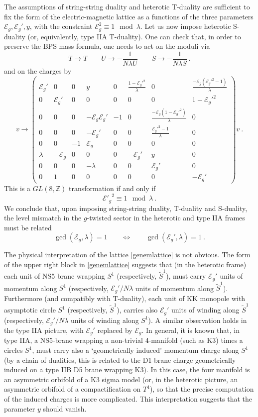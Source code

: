 \documentclass[a4paper,11pt]{article}
\newcommand{\ZZ}{\mathbb{Z}}
\newcommand{\E}{\mathcal{E}}
\numberwithin{equation}{section}
\def\be{\begin{equation}}
\def\ee{\end{equation}}
\begin{document}
The assumptions of string-string duality and heterotic T-duality are sufficient to fix the form of the electric-magnetic lattice as a functions of the three parameters $\E_g,\E_g',y$, with the constraint $\E_g^2\equiv 1\mod \lambda$. Let us now impose heterotic S-duality (or, equivalently, type IIA T-duality).
One can check that, in order to preserve the BPS mass formula, one needs to  act on the moduli via
\be T\to T\qquad U\to -\frac{1}{N\lambda U}\qquad S\to -\frac{1}{N\lambda S}\ .
\ee
and on the charges by
\be v\rightarrow
\begin{pmatrix}
 {\E_g'} & 0 & 0 & y & 0 & \frac{1-{\E_g'}^2}{\lambda} & 0 &
   \frac{{-\E_g} ({\E_g'}^2-1)}{\lambda} \\
 0 & {\E_g'} & 0 & 0 & 0 & 0 & 0 & 1-{\E_g'}^2 \\
 0 & 0 & 0 & -{\E_g} {\E_g'} & -1 & 0 & \frac{-{\E_g}(1-
   {\E_g'}^2)}{\lambda} & 0 \\
 0 & 0 & 0 & {-\E_g'} & 0 & 0 & \frac{{\E_g'}^2-1}{\lambda} & 0 \\
 0 & 0 & -1 & {\E_g} & 0 & 0 & 0 & 0 \\
 \lambda & -{\E_g} & 0 & 0 & 0 & -{\E_g'} & y & 0 \\
 0 & 0 & 0 & -\lambda & 0 & 0 & {\E_g'} & 0 \\
 0 & 1 & 0 & 0 & 0 & 0 & 0 & -{\E_g'}
\end{pmatrix}v\ .
\ee
This is a $GL(8,\ZZ)$ transformation if and only if
\be\label{coprime} {\E'_g}^2\equiv  1\mod \lambda\ .
\ee
We conclude that, upon imposing string-string duality, T-duality and S-duality, the level mismatch in the $g$-twisted sector in the heterotic and type IIA frames must be related
\be \gcd(\E_g,\lambda)=1\qquad \Leftrightarrow \qquad \gcd(\E_g',\lambda)=1\ .
\ee

 
 
The physical interpretation of the lattice \eqref{genemlattice} is not obvious. The form of the upper right block in \eqref{genemlattice} suggests that (in the heterotic frame) each unit of NS5 brane wrapping $S^1$ (respectively, $\tilde S^1$), must carry $ \E_g'$ units of momentum along $S^1$ (respectively, $\E_g'/N\lambda$ units of momentum along $\tilde S^1$). Furthermore (and compatibly with T-duality), each unit of KK monopole with asymptotic circle $S^1$ (respectively, $\tilde S^1$), carries also $\E_g'$ units of winding along $\tilde S^1$ (respectively, $ \E_g'/N\lambda$ units of winding along $S^1$). A similar observation holds in the type IIA picture, with $ \E_g'$ replaced by $\E_g$.  In general, it is known that, in type IIA, a NS5-brane wrapping a non-trivial 4-manifold (such as K3) times a circles $S^1$, must carry also a `geometrically induced' momentum charge along $S^1$ (by a chain of dualities, this is related to the D1-brane charge geometrically induced  on a type IIB D5 brane wrapping K3). In this case, the four manifold is an asymmetric orbifold of a K3 sigma model (or, in the heterotic picture, an asymmetric orbifold of a compactification on $T^4$), so that the precise computation of the induced charges is more complicated. This interpretation suggests that the parameter $y$ should vanish.
\end{document}
